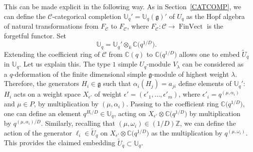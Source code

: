 \documentclass[pdftex]{sigma}%
\numberwithin{equation}{section}
\numberwithin{figure}{section}
\newcommand{\mUq}{\mathbb{U}_q}
\newcommand{\mc}{\mathbb{C}}
\newcommand{\mz}{\mathbb{Z}}
\begin{document}
This can be made explicit in the following way. As in Section~\ref{CATCOMP}, we can define the ${\mathcal C}$-categorical completion $\mUq'=\mUq(\mathfrak{g})'$ of $U_q$ as the Hopf algebra of natural transformations from $F_{\mathcal C}$ to $F_{\mathcal C}$, where $F_{\mathcal C}\colon {\mathcal C}\to \operatorname{FinVect}$ is the forgetful functor. Set
\[\mUq = \mUq' \otimes_k {\mathbb C}\big(q^{1/D}\big).\]
Extending the coefficient ring of $\mathcal{C}$ from $\mc(q)$ to $\mc\big(q^{1/D}\big)$ allows one to embed $\tilde U_q$ in $\mUq$. Let us explain this. The type $1$ simple $U_q$-module $V_\lambda$ can be considered as a $q$-deformation of the finite dimensional simple $\mathfrak{g}$-module of highest weight $\lambda$. Therefore, the generators $H_i\in \mathfrak{g}$ such that $\alpha_i(H_j)=a_{ji}$ define elements of $\mUq'$: $H_i$ acts on a weight space $X_{\epsilon'}$ of weight $\epsilon'=(\epsilon'_1,\dots,\epsilon'_m)$, where $\epsilon'_i = q^{(\mu,\alpha_i)}$ and $\mu\in P$, by multiplication by $(\mu,\alpha_i)$. Passing to the coefficient ring $\mc\big(q^{1/D}\big)$, one can define an element $q^{H_i/D}\in \mUq$, acting on $X_{\epsilon'}\otimes \mc\big(q^{1/D}\big)$ by multiplication by $q^{(\mu,\alpha_i)/D}$. Similarly, recalling that $(\mu,\omega_i)\in (1/D)\mz$, we can define the action of the generator $\ell_i \in \tilde U_q$ on $X_{\epsilon'}\otimes \mc\big(q^{1/D}\big)$ as the multiplication by $q^{(\mu,\omega_i)}$. This provides the claimed embedding $\tilde U_q\subset\mUq$.
\end{document}
